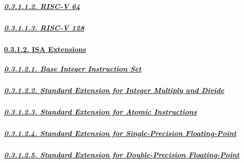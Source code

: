 \documentclass[
]{article}
\begin{document}
\hypertarget{risc-v-64}{%
\subparagraph{\texorpdfstring{\protect\hyperlink{risc-v-64-1}{0.3.1.1.2.
RISC-V 64}}{0.3.1.1.2. RISC-V 64}}\label{risc-v-64}}

\hypertarget{risc-v-128}{%
\subparagraph{\texorpdfstring{\protect\hyperlink{risc-v-128-1}{0.3.1.1.3.
RISC-V 128}}{0.3.1.1.3. RISC-V 128}}\label{risc-v-128}}

\hypertarget{isa-extensions}{%
\paragraph{\texorpdfstring{\protect\hyperlink{isa-extensions-3}{0.3.1.2.
ISA Extensions}}{0.3.1.2. ISA Extensions}}\label{isa-extensions}}

\hypertarget{base-integer-instruction-set}{%
\subparagraph{\texorpdfstring{\protect\hyperlink{base-integer-instruction-set-1}{0.3.1.2.1.
Base Integer Instruction
Set}}{0.3.1.2.1. Base Integer Instruction Set}}\label{base-integer-instruction-set}}

\hypertarget{standard-extension-for-integer-multiply-and-divide}{%
\subparagraph{\texorpdfstring{\protect\hyperlink{standard-extension-for-integer-multiply-and-divide-1}{0.3.1.2.2.
Standard Extension for Integer Multiply and
Divide}}{0.3.1.2.2. Standard Extension for Integer Multiply and Divide}}\label{standard-extension-for-integer-multiply-and-divide}}

\hypertarget{standard-extension-for-atomic-instructions}{%
\subparagraph{\texorpdfstring{\protect\hyperlink{standard-extension-for-atomic-instructions-1}{0.3.1.2.3.
Standard Extension for Atomic
Instructions}}{0.3.1.2.3. Standard Extension for Atomic Instructions}}\label{standard-extension-for-atomic-instructions}}

\hypertarget{standard-extension-for-single-precision-floating-point}{%
\subparagraph{\texorpdfstring{\protect\hyperlink{standard-extension-for-single-precision-floating-point-1}{0.3.1.2.4.
Standard Extension for Single-Precision
Floating-Point}}{0.3.1.2.4. Standard Extension for Single-Precision Floating-Point}}\label{standard-extension-for-single-precision-floating-point}}

\hypertarget{standard-extension-for-double-precision-floating-point}{%
\subparagraph{\texorpdfstring{\protect\hyperlink{standard-extension-for-double-precision-floating-point-1}{0.3.1.2.5.
Standard Extension for Double-Precision
Floating-Point}}{0.3.1.2.5. Standard Extension for Double-Precision Floating-Point}}\label{standard-extension-for-double-precision-floating-point}}
\end{document}
